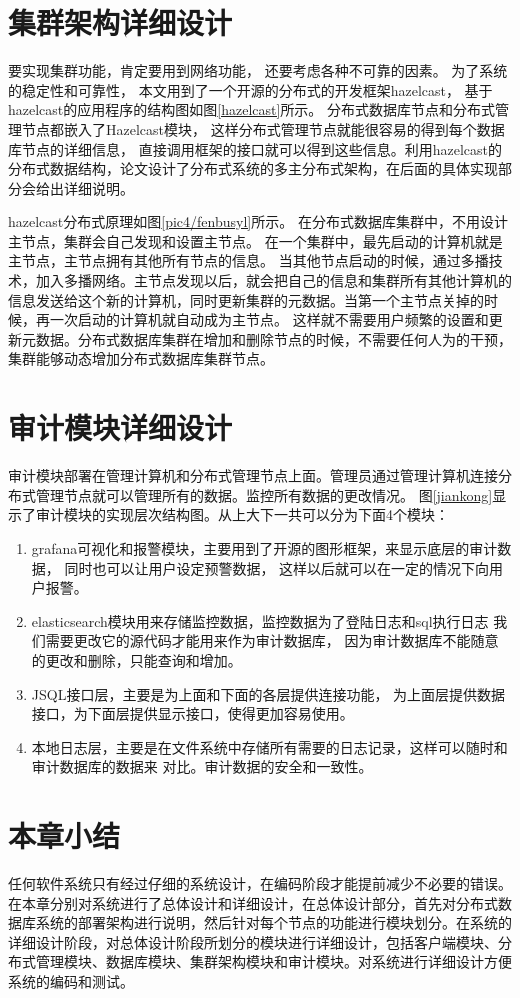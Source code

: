 \section{集群架构详细设计}
要实现集群功能，肯定要用到网络功能，
还要考虑各种不可靠的因素。
为了系统的稳定性和可靠性，
本文用到了一个开源的分布式的开发框架hazelcast，
基于hazelcast的应用程序的结构图如图\ref{hazelcast}所示。
分布式数据库节点和分布式管理节点都嵌入了Hazelcast模块，
这样分布式管理节点就能很容易的得到每个数据库节点的详细信息，
直接调用框架的接口就可以得到这些信息。利用hazelcast的分布式数据结构，论文设计了分布式系统的多主分布式架构，在后面的具体实现部分会给出详细说明。

hazelcast分布式原理如图\ref{pic4/fenbusyl}所示。
在分布式数据库集群中，不用设计主节点，集群会自己发现和设置主节点。
在一个集群中，最先启动的计算机就是主节点，主节点拥有其他所有节点的信息。
当其他节点启动的时候，通过多播技术，加入多播网络。主节点发现以后，就会把自己的信息和集群所有其他计算机的信息发送给这个新的计算机，同时更新集群的元数据。当第一个主节点关掉的时候，再一次启动的计算机就自动成为主节点。
这样就不需要用户频繁的设置和更新元数据。分布式数据库集群在增加和删除节点的时候，不需要任何人为的干预，集群能够动态增加分布式数据库集群节点。
\section{审计模块详细设计}
审计模块部署在管理计算机和分布式管理节点上面。管理员通过管理计算机连接分布式管理节点就可以管理所有的数据。监控所有数据的更改情况。
图\ref{jiankong}显示了审计模块的实现层次结构图。从上大下一共可以分为下面4个模块：
\begin{enumerate}[fullwidth,itemindent=2em,listparindent=2em]
	\item grafana可视化和报警模块，主要用到了开源的图形框架，来显示底层的审计数据，
	同时也可以让用户设定预警数据，
	这样以后就可以在一定的情况下向用户报警。
	\item elasticsearch模块用来存储监控数据，监控数据为了登陆日志和sql执行日志
	我们需要更改它的源代码才能用来作为审计数据库，
	因为审计数据库不能随意的更改和删除，只能查询和增加。
	\item JSQL接口层，主要是为上面和下面的各层提供连接功能，
	为上面层提供数据接口，为下面层提供显示接口，使得更加容易使用。
	\item 本地日志层，主要是在文件系统中存储所有需要的日志记录，这样可以随时和审计数据库的数据来
	对比。审计数据的安全和一致性。
\end{enumerate}
\section{本章小结}
任何软件系统只有经过仔细的系统设计，在编码阶段才能提前减少不必要的错误。
在本章分别对系统进行了总体设计和详细设计，在总体设计部分，首先对分布式数据库系统的部署架构进行说明，然后针对每个节点的功能进行模块划分。在系统的详细设计阶段，对总体设计阶段所划分的模块进行详细设计，包括客户端模块、分布式管理模块、数据库模块、集群架构模块和审计模块。对系统进行详细设计方便系统的编码和测试。